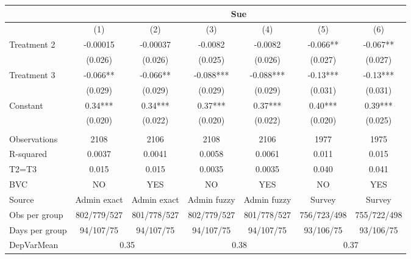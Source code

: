 \begin{tabular}{lcccccc}
\toprule
      & \multicolumn{6}{c}{Sue} \\
\midrule
\midrule
      & (1)   & (2)   & (3)   & (4)   & (5)   & (6) \\
\midrule
\midrule
Treatment 2 & -0.00015 & -0.00037 & -0.0082 & -0.0082 & -0.066** & -0.067** \\
      & (0.026) & (0.026) & (0.025) & (0.026) & (0.027) & (0.027) \\
Treatment 3 & -0.066** & -0.066** & -0.088*** & -0.088*** & -0.13*** & -0.13*** \\
      & (0.029) & (0.029) & (0.029) & (0.029) & (0.031) & (0.031) \\
Constant & 0.34*** & 0.34*** & 0.37*** & 0.37*** & 0.40*** & 0.39*** \\
      & (0.020) & (0.022) & (0.020) & (0.022) & (0.020) & (0.025) \\
      &       &       &       &       &       &  \\
\midrule
Observations & 2108  & 2106  & 2108  & 2106  & 1977  & 1975 \\
R-squared & 0.0037 & 0.0041 & 0.0058 & 0.0061 & 0.011 & 0.015 \\
T2=T3 & 0.015 & 0.015 & 0.0035 & 0.0035 & 0.040 & 0.041 \\
BVC   & NO    & YES   & NO    & YES   & NO    & YES \\
Source & Admin exact & Admin exact & Admin fuzzy & Admin fuzzy & Survey & Survey \\
Obs per group & 802/779/527 & 801/778/527 & 802/779/527 & 801/778/527 & 756/723/498 & 755/722/498 \\
Days per group & 94/107/75 & 94/107/75 & 94/107/75 & 94/107/75 & 93/106/75 & 93/106/75 \\
DepVarMean & \multicolumn{2}{c}{0.35} & \multicolumn{2}{c}{0.38} & \multicolumn{2}{c}{0.37} \\
\bottomrule
\bottomrule
\end{tabular}%
